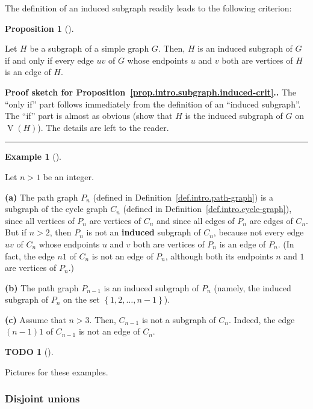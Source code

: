 \documentclass[numbers=enddot,12pt,final,onecolumn,notitlepage]{scrartcl}%
\theoremstyle{definition}
\newtheorem{prop}[theo]{Proposition}
\newenvironment{proposition}[1][]
{\begin{prop}[#1]\begin{leftbar}}
{\end{leftbar}\end{prop}}
\newtheorem{exam}[theo]{Example}
\newenvironment{example}[1][]
{\begin{exam}[#1]\begin{leftbar}}
{\end{leftbar}\end{exam}}
\newtheorem{quest}[theo]{TODO}
\newenvironment{todo}[1][]
{\begin{quest}[#1]\begin{leftbar}}
{\end{leftbar}\end{quest}}
\newenvironment{proof}[1][Proof]{\noindent\textbf{#1.} }{\ \rule{0.5em}{0.5em}}
\newcommand{\set}[1]{\left\{ #1 \right\}}
\newcommand{\tup}[1]{\left( #1 \right)}
\newcommand{\verts}[1]{\operatorname{V}\left( #1 \right)}
\begin{document}
The definition of an induced subgraph readily leads to the following
criterion:

\begin{proposition} \label{prop.intro.subgraph.induced-crit}
Let $H$ be a subgraph of a simple graph $G$. Then, $H$ is an induced
subgraph of $G$ if and only if every edge $uv$ of $G$ whose endpoints
$u$ and $v$ both are vertices of $H$ is an edge of $H$.
\end{proposition}

\begin{proof}[Proof sketch for
Proposition~\ref{prop.intro.subgraph.induced-crit}.]
The ``only if'' part follows immediately from the definition of an
``induced subgraph''. The ``if'' part is almost as obvious (show that
$H$ is the induced subgraph of $G$ on $\verts{H}$). The details are
left to the reader.
\end{proof}

\begin{example} \label{exa.intro.subgraph}
Let $n > 1$ be an integer.

\textbf{(a)} The path graph $P_n$ (defined in
Definition~\ref{def.intro.path-graph}) is a subgraph of the cycle
graph $C_n$ (defined in Definition~\ref{def.intro.cycle-graph}),
since all vertices of $P_n$ are vertices of $C_n$ and since all edges
of $P_n$ are edges of $C_n$. But if $n > 2$, then
$P_n$ is not an \textbf{induced} subgraph of $C_n$,
because not every edge $uv$ of $C_n$ whose
endpoints $u$ and $v$ both are vertices of $P_n$ is an edge of $P_n$.
(In fact, the edge $n1$ of $C_n$ is not an edge of $P_n$, although
both its endpoints $n$ and $1$ are vertices of $P_n$.)

\textbf{(b)} The path graph $P_{n-1}$ is an induced subgraph of $P_n$
(namely, the induced subgraph of $P_n$ on the set
$\set{1, 2, \ldots, n-1}$).

\textbf{(c)} Assume that $n > 3$. Then, $C_{n-1}$ is not a subgraph of
$C_n$. Indeed, the edge $\tup{n-1}1$ of $C_{n-1}$ is not an edge of
$C_n$.
\end{example}

\begin{todo}
Pictures for these examples.
\end{todo}

\subsubsection{\label{subsect.intro.djun}Disjoint unions}
\end{document}
